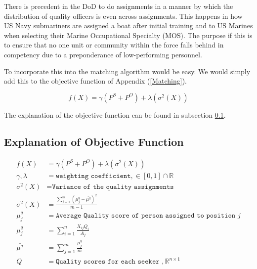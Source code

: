 There is precedent in the DoD to do assignments in a manner by which the distribution of quality officers is even across assignments. This happens in how US Navy submariners are assigned a boat after initial training and to US Marines when selecting their Marine Occupational Specialty (MOS). The purpose if this is to ensure that no one unit or community within the force falls behind in competency due to a preponderance of low-performing personnel. 

To incorporate this into the matching algorithm would be easy. We would simply add this to the objective function of Appendix (\ref{Matching}).

\[ f(X) = \gamma(P^S + P^O) + \lambda (\sigma^2(X)) \]

The explanation of the objective function can be found in subsection \ref{quality_obj}.

\subsection{Explanation of Objective Function}
\label{quality_obj}

\begin{align}
f(X) &= \gamma(P^S + P^O) + \lambda (\sigma^2(X)) \\
    \gamma, \lambda &= \texttt{weighting coefficient}, \in [0,1] \cap \mathbb{R} \\
    \sigma^2(X) &= \texttt{Variance of the quality assignments} \\
    \sigma^2(X) &= \frac{\sum_{j=1}^m (\mu^q_j - \bar{\mu^q})^2}{m-1} \\
    \mu^q_j &= \texttt{Average Quality score of person assigned to position } j \\
    \mu^q_j &= \sum_{i=1}^n  \frac{X_{ij} Q_i}{A_j} \\
    \bar{\mu^q} &= \sum_{j=1}^m \frac{\mu^q_j}{m} \\
    Q &= \texttt{Quality scores for each seeker }, \mathbb{R}^{n \times 1}
\end{align}
